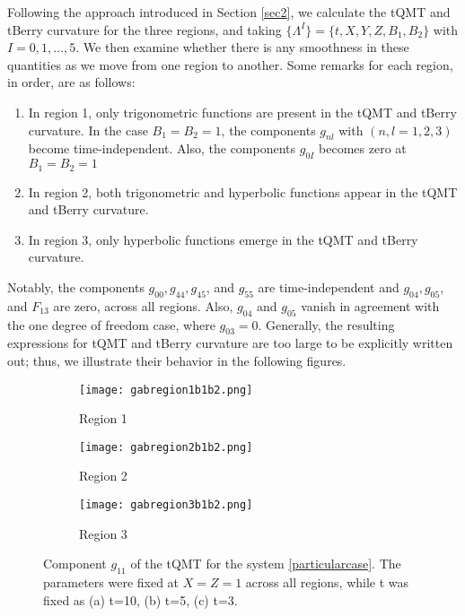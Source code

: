 \documentclass[12pt]{iopart}
\begin{document}
Following the approach introduced in Section \ref{sec2}, we calculate the tQMT and tBerry curvature for the three regions, and taking $\{\Lambda^I\}=\{t, X, Y, Z, B_1, B_2\}$ with $I=0,1,\dots, 5$. We then examine whether there is any smoothness in these quantities as we move from one region to another. Some remarks for each region, in order, are as follows:
\begin{enumerate}
    \item In region 1, only trigonometric functions are present in the tQMT and tBerry curvature. In the case $B_1=B_2=1$, the components $g_{nl}$ with $(n,l=1,2,3)$ become time-independent. Also, the components $g_{0I}$ becomes zero at $B_1=B_2=1$
    \item In region 2, both trigonometric and hyperbolic functions appear in the tQMT and tBerry curvature.
    \item In region 3, only hyperbolic functions emerge in the tQMT and tBerry curvature.
\end{enumerate} 
Notably, the components $g_{00},g_{44}, g_{45}$, and $g_{55}$ are time-independent and  $g_{04},g_{05}$, and $F_{13}$ are zero, across all regions. Also, $g_{04}$ and $g_{05}$ vanish in agreement with the one degree of freedom case, where $g_{03}=0$. Generally, the resulting expressions for tQMT and tBerry curvature are too large to be explicitly written out; thus, we illustrate their behavior in the following figures.
\begin{figure}[H]
  \centering
  \begin{subfigure}{0.45\linewidth}{\texttt{[image: gabregion1b1b2.png]}}
    \caption{Region 1}
    \label{fig:gabcopladovariandob1b2a}
  \end{subfigure}
  \begin{subfigure}{0.45\linewidth}\texttt{[image: gabregion2b1b2.png]}
    \caption{Region 2}
    \label{fig:gabcopladovariandob1b2b}  
  \end{subfigure}
   \begin{subfigure}{0.45\linewidth}\texttt{[image: gabregion3b1b2.png]}
    \caption{Region 3}
    \label{fig:gabcopladovariandob1b2c}  
  \end{subfigure}
  \captionsetup{font=small} 
  \caption{\justifying Component $g_{11}$ of the tQMT for the system \eqref{particularcase}. The parameters were fixed at $X=Z=1$ across all regions, while t was fixed as  (a) t=10, (b) t=5, (c) t=3.}    \label{fig:gabcopladovariandob1b2}
\end{figure}
\end{document}
